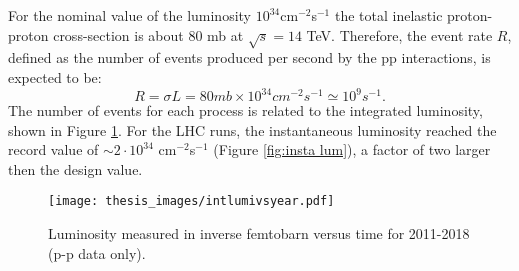 \documentclass[a4paper, oneside, 11pt, openright]{book}
\begin{document}
				For the nominal value of the luminosity $10^{34}$cm$^{-2}$s$^{-1}$ the total inelastic proton-proton cross-section is about 80 mb at $\sqrt{s} = 14$ TeV. Therefore, the event rate $R$, defined as the number of events produced per second by the pp interactions, is expected to be:
				$$
				R = \sigma L = 80 mb\times10^{34}cm^{-2}s^{-1} \simeq 10^{9}s^{-1}.
				$$ 
				The number of events for each process is related to the integrated luminosity, shown in Figure \ref{fig:Integreted Luminosity}. For the LHC runs, the instantaneous luminosity reached the record value of $\sim 2 \cdot 10^{34}$ cm$^{-2}$s$^{-1}$ (Figure \ref{fig:insta lum}), a factor of two larger then the design value.
				
				\begin{figure}
					\centering
					\texttt{[image: thesis\_images/intlumivsyear.pdf]}
					\caption{Luminosity measured in inverse femtobarn versus time for 2011-2018 (p-p data only).}
					\label{fig:Integreted Luminosity}
				\end{figure}
				
\end{document}

